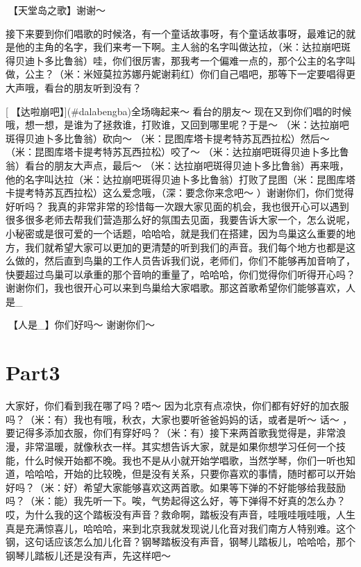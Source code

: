 \documentclass[
]{book}
\begin{document}
🎵【天堂岛之歌】谢谢～

接下来要到你们唱歌的时候洛，有一个童话故事呀，有个童话故事呀，最难记的就是他的主角的名字，我们来考一下啊。主人翁的名字叫做达拉，（米：达拉崩吧斑得贝迪卜多比鲁翁）哇，你们很厉害，那我考一个偏难一点的，那个公主的名字叫做，公主？（米：米娅莫拉苏娜丹妮谢莉红）你们自己唱吧，那等下一定要唱得更大声哦，看台的朋友听到没有？

[🎵【达啦崩吧】](#dalabengba)全场嗨起来～ 看台的朋友～ 现在又到你们唱的时候哦，想一想，是谁为了拯救谁，打败谁，又回到哪里呢？于是～ （米：达拉崩吧斑得贝迪卜多比鲁翁）砍向～ （米：昆图库塔卡提考特苏瓦西拉松）然后～ （米：昆图库塔卡提考特苏瓦西拉松）咬了～ （米：达拉崩吧斑得贝迪卜多比鲁翁）看台的朋友大声点，最后～ （米：达拉崩吧斑得贝迪卜多比鲁翁）再来哦，他的名字叫达拉（米：达拉崩吧斑得贝迪卜多比鲁翁）打败了昆图（米：昆图库塔卡提考特苏瓦西拉松）这么爱念哦，（深：要念你来念吧～ ）谢谢你们，你们觉得好听吗？
我真的非常非常的珍惜每一次跟大家见面的机会，我也很开心可以遇到很多很多老师去帮我们营造那么好的氛围去见面，我要告诉大家一个，怎么说呢，小秘密或是很可爱的一个话题，哈哈哈，就是我们在搭建，因为鸟巢这么重要的地方，我们就希望大家可以更加的更清楚的听到我们的声音。我们每个地方也都是这么做的，然后直到鸟巢的工作人员告诉我们说，老师们，你们不能够再加音响了，快要超过鸟巢可以承重的那个音响的重量了，哈哈哈，你们觉得你们听得开心吗？谢谢你们，我也很开心可以来到鸟巢给大家唱歌。那这首歌希望你们能够喜欢，人是\_

🎵【人是\_】你们好吗～ 谢谢你们～

\section{Part3}\label{beijing-20240921-part3}

大家好，你们看到我在哪了吗？唔～ 因为北京有点凉快，你们都有好好的加衣服吗？（米：有）我也有哦，秋衣，大家也要听爸爸妈妈的话，或者是听～ 话～ ，要记得多添加衣服，你们有穿好吗？（米：有）接下来两首歌我觉得是，非常浪漫，非常温暖，就像秋衣一样。其实想告诉大家，就是如果你想学习任何一个技能，什么时候开始都不晚。我也不是从小就开始学唱歌，当然学琴，你们一听也知道，哈哈哈，开始的比较晚，但是没有关系，只要你喜欢的事情，随时都可以开始好吗？（米：好）希望大家能够喜欢这两首歌。如果等下弹的不好能够给我鼓励吗？（米：能）我先听一下。唉，气势起得这么好，等下弹得不好真的怎么办？哎，为什么我的这个踏板没有声音？救命啊，踏板没有声音，哇哦哇哦哇哦，人生真是充满惊喜儿，哈哈哈，来到北京我就发现说儿化音对我们南方人特别难。这个钢，这句话应该怎么加儿化音？钢琴踏板没有声音，钢琴儿踏板儿，哈哈哈，那个钢琴儿踏板儿还是没有声，先这样吧～
\end{document}
